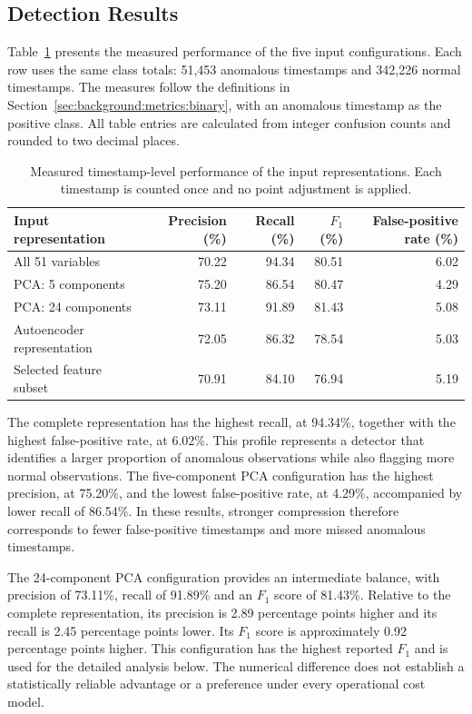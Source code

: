 \subsection{Detection Results}
\label{sec:anomaly:gan-results}

Table~\ref{tab:anomaly:gan-representations} presents the measured performance of
the five input configurations. Each row uses the same class totals: 51,453 anomalous timestamps
and 342,226 normal timestamps. The measures follow the definitions in
Section~\ref{sec:background:metrics:binary}, with an anomalous timestamp as the positive class.
All table entries are calculated from integer confusion counts and rounded to two decimal
places.

\begin{table}[tbp]
  \centering
  \caption{Measured timestamp-level performance of the input representations. Each timestamp
  is counted once and no point adjustment is applied.}
  \label{tab:anomaly:gan-representations}
  \small
  \begin{tabular}{@{}lrrrr@{}}
    \toprule
    Input representation & Precision (\%) & Recall (\%) & $F_1$ (\%) & False-positive rate (\%) \\
    \midrule
    All 51 variables           & 70.22 & 94.34 & 80.51 & 6.02 \\
    PCA: 5 components          & 75.20 & 86.54 & 80.47 & 4.29 \\
    PCA: 24 components         & 73.11 & 91.89 & 81.43 & 5.08 \\
    Autoencoder representation & 72.05 & 86.32 & 78.54 & 5.03 \\
    Selected feature subset    & 70.91 & 84.10 & 76.94 & 5.19 \\
    \bottomrule
  \end{tabular}
\end{table}

The complete representation has the highest recall, at 94.34\%, together with the
highest false-positive rate, at 6.02\%. This profile represents a detector that identifies a
larger proportion of anomalous observations while also flagging more normal observations. The
five-component PCA configuration has the highest precision, at 75.20\%, and the lowest
false-positive rate, at 4.29\%, accompanied by lower recall of 86.54\%. In these results,
stronger compression therefore corresponds to fewer false-positive timestamps and more
missed anomalous timestamps.

The 24-component PCA configuration provides an intermediate balance, with precision of 73.11\%,
recall of 91.89\% and an $F_1$ score of 81.43\%. Relative to the complete representation, its
precision is 2.89 percentage points higher and its recall is 2.45 percentage points lower. Its
$F_1$ score is approximately 0.92 percentage points higher. This configuration has the highest
reported $F_1$ and is used for the detailed analysis below. The numerical difference does not
establish a statistically reliable advantage or a preference under every operational cost model.

